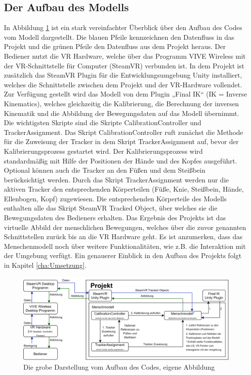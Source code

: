 \subsection{Der Aufbau des Modells}\label{sec:AufbauModell}
In Abbildung \ref{fig:CodeDarstellung} ist ein stark vereinfachter Überblick über den Aufbau des Codes vom Modell dargestellt. Die blauen Pfeile kennzeichnen den Datenfluss in das Projekt und die grünen Pfeile den Datenfluss aus dem Projekt heraus. Der Bediener nutzt die VR Hardware, welche über das Programm VIVE Wireless mit der VR-Schnittstelle für Computer (SteamVR) verbunden ist. In dem Projekt ist zusätzlich das SteamVR Plugin für die Entwicklungsumgebung Unity installiert, welches die Schnittstelle zwischen dem Projekt und der VR-Hardware vollendet. Zur Verfügung gestellt wird das Modell von dem Plugin „Final IK“ (IK = Inverse Kinematics), welches gleichzeitig die Kalibrierung, die Berechnung der inversen Kinematik und die Abbildung der Bewegungsdaten auf das Modell übernimmt. Die wichtigsten Skripte sind die Skripte CalibrationController und TrackerAssignment. Das Skript CalibrationController ruft zunächst die Methode für die Zuweisung der Tracker in dem Skript TrackerAssignment auf, bevor der Kalibrierungsprozess gestartet wird. Der Kalibrierungsprozess wird standardmäßig mit Hilfe der Positionen der Hände und des Kopfes ausgeführt. Optional können auch die Tracker an den Füßen und dem Steißbein berücksichtigt werden. Durch das Skript TrackerAssignment werden nur die aktiven Tracker den entsprechenden Körperteilen (Füße, Knie, Steißbein, Hände, Ellenbogen, Kopf) zugewiesen. Die entsprechenden Körperteile des Modells enthalten alle das Skript SteamVR Tracked Object, über welches sie die Bewegungsdaten des Bedieners erhalten. Das Ergebnis des Projekts ist das virtuelle Abbild der menschlichen Bewegungen, welches über die zuvor genannten Schnittstellen zurück bis an die VR Hardware geht. Es ist anzumerken, dass das Menschenmodell noch über weitere Funktionalitäten, wie z.B. die Interaktion mit der Umgebung verfügt. Ein genauerer Einblick in den Aufbau des Projekts folgt in Kapitel \ref{cha:Umsetzung}.
\begin{figure}[h]
	\centering
	\includegraphics[width=0.9\linewidth]{Bilder/A25_CodeDarstellung}
	\caption{Die grobe Darstellung vom Aufbau des Codes, eigene Abbildung}
	\label{fig:CodeDarstellung}
\end{figure}

